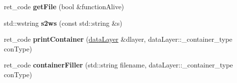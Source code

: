 \begin{DoxyCompactItemize}
\item 
\hypertarget{classdata_layer_a1700388af65d3a2c3574bbfc469cb657}{}ret\+\_\+code {\bfseries get\+File} (bool \&function\+Alive)\label{classdata_layer_a1700388af65d3a2c3574bbfc469cb657}

\item 
\hypertarget{classdata_layer_a86172ed5533e1c94e132a1fefd1a263b}{}std\+::wstring {\bfseries s2ws} (const std\+::string \&s)\label{classdata_layer_a86172ed5533e1c94e132a1fefd1a263b}

\item 
\hypertarget{classdata_layer_aa09cfd7bb4e7bd3772b2959cc0238ce3}{}ret\+\_\+code {\bfseries print\+Container} (\hyperlink{classdata_layer}{data\+Layer} \&dlayer, data\+Layer\+::\+\_\+container\+\_\+type con\+Type)\label{classdata_layer_aa09cfd7bb4e7bd3772b2959cc0238ce3}

\item 
\hypertarget{classdata_layer_ab667fa967de628fffdd1728ca7e42f58}{}ret\+\_\+code {\bfseries container\+Filler} (std\+::string filename, data\+Layer\+::\+\_\+container\+\_\+type con\+Type)\label{classdata_layer_ab667fa967de628fffdd1728ca7e42f58}

\end{DoxyCompactItemize}
